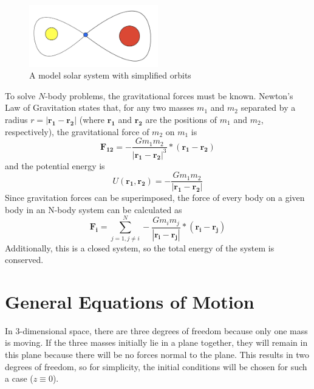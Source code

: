 \documentclass[preprint,titlepage,preprintnumbers,amsmath,amssymb,aps,11pt]{revtex4-2}
\begin{document}
\begin{figure}
    \centering
    \includegraphics[width=0.5\textwidth]{Fig 1.jpeg}
    \caption{A model solar system with simplified orbits}
    \label{fig:orbit}
\end{figure}

To solve $N$-body problems, the gravitational forces must be known. Newton's Law of Gravitation states that, for any two masses $m_1$ and $m_2$ separated by a radius $r=|\bm{r_1}-\bm{r_2}|$ (where $\bm{r_1}$ and $\bm{r_2}$ are the positions of $m_1$ and $m_2$, respectively), the gravitational force of $m_2$ on $m_1$ is
\begin{equation}
    \bm{F_{12}}=-\frac{Gm_1 m_2}{|\bm{r_1}-\bm{r_2}|^3}*(\bm{r_1}-\bm{r_2})
\end{equation}
and the potential energy is
\begin{equation}
    U(\bm{r_1},\bm{r_2})=-\frac{Gm_1 m_2}{|\bm{r_1}-\bm{r_2}|}
\end{equation}
Since gravitation forces can be superimposed, the force of every body on a given body in an N-body system can be calculated as
\begin{equation}
    \bm{F_i}=\sum_{j=1, j \neq i}^N -\frac{Gm_im_j}{|\bm{r_i}-\bm{r_j}|}*(\bm{r_i}-\bm{r_j})
\end{equation}
Additionally, this is a closed system, so the total energy of the system is conserved.

\section{General Equations of Motion}\label{sec:analytical}
In 3-dimensional space, there are three degrees of freedom because only one mass is moving. If the three masses initially lie in a plane together, they will remain in this plane because there will be no forces normal to the plane. This results in two degrees of freedom, so for simplicity, the initial conditions will be chosen for such a case ($z\equiv0$).
\end{document}
